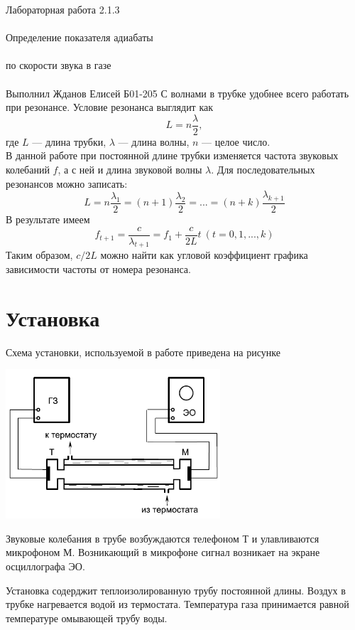 \documentclass{astroedu-lab}
\begin{document}
\begin{problem}{\huge Лабораторная работа 2.1.3\\\\Определение показателя адиабаты\\\\по скорости звука в газе\\\\Выполнил Жданов Елисей Б01-205}
С волнами в трубке удобнее всего работать при резонансе. Условие резонанса выглядит как
	\begin{equation}
	L = n\frac{\lambda}{2},
	\end{equation}
где $L$ --- длина трубки, $\lambda$ --- длина волны, $n$ --- целое число.\\
В данной работе при постоянной длине трубки изменяется частота звуковых колебаний $f$, а с ней и длина звуковой волны $\lambda$. Для последовательных резонансов можно записать:
	\begin{equation}
	L = n\frac{\lambda_1}{2} = (n + 1)\frac{\lambda_2}{2} = ... = (n + k)\frac{\lambda_{k + 1}}{2}
	\end{equation}
В результате имеем
	\begin{equation}
	f_{t+1} = \frac{c}{\lambda_{t+1}} = f_1 + \frac{c}{2L}t~ (t = 0, 1,..., k)
	\end{equation}
Таким образом, $c/2L$ можно найти как угловой коэффициент графика зависимости частоты от номера резонанса.

\section{Установка}
 Схема установки, используемой в работе приведена на рисунке\\
 
\begin{center}
\includegraphics[width=0.6\textwidth]{установка.png}
\label{ris:image}
\end{center}

Звуковые колебания в трубе возбуждаются телефоном Т и улавливаются микрофоном М. Возникающий в микрофоне сигнал возникает на экране осциллографа ЭО.

Установка содерджит теплоизолированную трубу постоянной длины. Воздух в трубке нагревается водой из термостата. Температура газа принимается равной температуре омывающей трубу воды. 


\end{problem}
\end{document}
